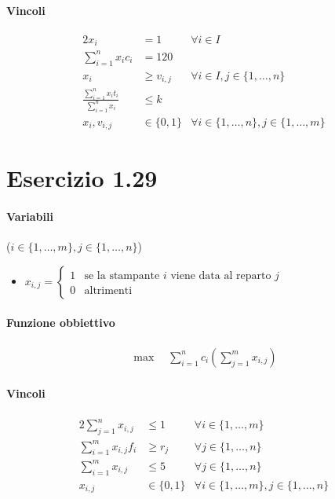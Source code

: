 \documentclass{article}
\begin{document}
\paragraph{Vincoli}
\begin{alignat}{2}
  x_i &= 1 &\forall i \in I \\
  \sum_{i=1}^n x_i c_i &= 120 &\\
  x_i &\geq v_{i,j} &\forall i \in I, j \in \{1,\ldots,n\} \\
  \frac{\sum_{i=1}^n x_i t_i}{\sum_{i=1}^n x_i} &\leq k & \\
  x_i, v_{i,j} &\in \{0,1\} &\forall i \in \{1,\ldots,n\}, j \in \{1,\ldots,m\}
\end{alignat}

\pagebreak
\section{Esercizio 1.29}

\paragraph{Variabili} ($i \in \{1,\ldots,m\}, j \in \{1,\ldots,n\}$)
\begin{itemize}
  \item $x_{i,j} = \begin{cases}
      1 & \text{se la stampante }i \text{ viene data al reparto }j \\
      0 & \text{altrimenti}
  \end{cases}$
\end{itemize}

\paragraph{Funzione obbiettivo}
\begin{align*}
  \max \quad \sum_{i=1}^n c_i (\sum_{j=1}^m x_{i,j})
\end{align*}

\paragraph{Vincoli}
\begin{alignat}{2}
  \sum_{j=1}^n x_{i,j} &\leq 1 &\forall i \in \{1,\ldots,m\} \\
  \sum_{i=1}^m x_{i,j} f_i &\geq r_j &\forall j \in \{1,\ldots,n\} \\
  \sum_{i=1}^m x_{i,j} &\leq 5 &\forall j \in \{1,\ldots,n\} \\
  x_{i,j} &\in \{0,1\} &\forall i \in \{1,\ldots,m\}, j \in \{1,\ldots,n\}
\end{alignat}
\end{document}

